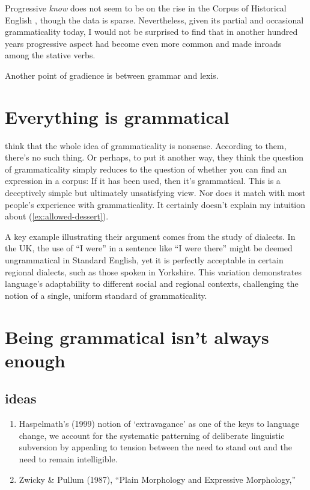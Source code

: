 Progressive \textit{know} does not seem to be on the rise in the Corpus of Historical English \citep{Granath2014}, though the data is sparse. Nevertheless, given its partial and occasional grammaticality today, I would not be surprised to find that in another hundred years progressive aspect had become even more common and made inroads among the stative verbs.

Another point of gradience is between grammar and lexis.

\section{Everything is grammatical}

\citet{Sampson2014b} think that the whole idea of grammaticality is nonsense. According to them, there's no such thing. Or perhaps, to put it another way, they think the question of grammaticality simply reduces to the question of whether you can find an expression in a corpus: If it has been used, then it's grammatical. This is a deceptively simple but ultimately unsatisfying view. Nor does it match with most people's experience with grammaticality. It certainly doesn't explain my intuition about (\ref{ex:allowed-dessert}).

A key example illustrating their argument comes from the study of dialects. In the UK, the use of \enquote{I were} in a sentence like \enquote{I were there} might be deemed ungrammatical in Standard English, yet it is perfectly acceptable in certain regional dialects, such as those spoken in Yorkshire. This variation demonstrates language's adaptability to different social and regional contexts, challenging the notion of a single, uniform standard of grammaticality.


\section{Being grammatical isn't always enough}

\subsection{ideas}
\begin{enumerate}
    \item Haspelmath's (1999) notion of `extravagance' as one of the keys to language change, we account for the systematic patterning of deliberate linguistic subversion by appealing to tension between the need to stand out and the need to remain intelligible.
    \item Zwicky \& Pullum (1987), \enquote{Plain Morphology and Expressive Morphology,}
\end{enumerate}


